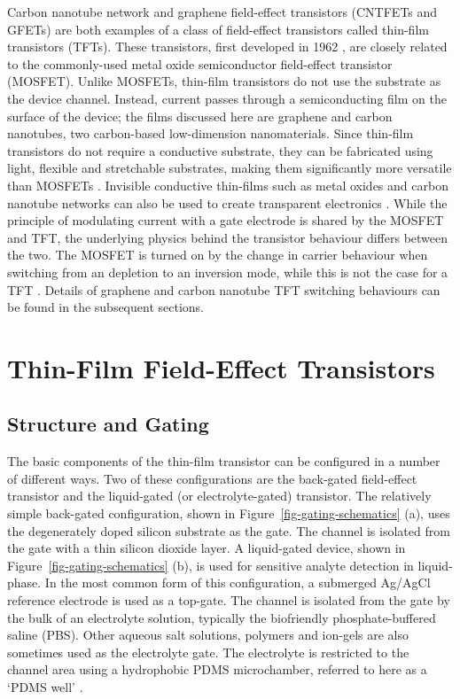 \documentclass[
  a4paper,
]{scrbook}
\begin{document}
Carbon nanotube network and graphene field-effect transistors (CNTFETs
and GFETs) are both examples of a class of field-effect transistors
called thin-film transistors (TFTs). These transistors, first developed
in 1962 \autocite{Weimer1962}, are closely related to the commonly-used
metal oxide semiconductor field-effect transistor (MOSFET). Unlike
MOSFETs, thin-film transistors do not use the substrate as the device
channel. Instead, current passes through a semiconducting film on the
surface of the device; the films discussed here are graphene and carbon
nanotubes, two carbon-based low-dimension nanomaterials. Since thin-film
transistors do not require a conductive substrate, they can be
fabricated using light, flexible and stretchable substrates, making them
significantly more versatile than MOSFETs
\autocite{Cao2009,Petti2016,Shkodra2021}. Invisible conductive
thin-films such as metal oxides and carbon nanotube networks can also be
used to create transparent electronics \autocite{Cao2009}. While the
principle of modulating current with a gate electrode is shared by the
MOSFET and TFT, the underlying physics behind the transistor behaviour
differs between the two. The MOSFET is turned on by the change in
carrier behaviour when switching from an depletion to an inversion mode,
while this is not the case for a TFT \autocite{Petti2016}. Details of
graphene and carbon nanotube TFT switching behaviours can be found in
the subsequent sections.

\hypertarget{sec-general-FETs}{%
\section{Thin-Film Field-Effect Transistors}\label{sec-general-FETs}}

\hypertarget{sec-gating}{%
\subsection{Structure and Gating}\label{sec-gating}}

The basic components of the thin-film transistor can be configured in a
number of different ways. Two of these configurations are the back-gated
field-effect transistor and the liquid-gated (or electrolyte-gated)
transistor. The relatively simple back-gated configuration, shown in
Figure~\ref{fig-gating-schematics} (a), uses the degenerately doped
silicon substrate as the gate. The channel is isolated from the gate
with a thin silicon dioxide layer. A liquid-gated device, shown in
Figure~\ref{fig-gating-schematics} (b), is used for sensitive analyte
detection in liquid-phase. In the most common form of this
configuration, a submerged Ag/AgCl reference electrode is used as a
top-gate. The channel is isolated from the gate by the bulk of an
electrolyte solution, typically the biofriendly phosphate-buffered
saline (PBS). Other aqueous salt solutions, polymers and ion-gels are
also sometimes used as the electrolyte gate. The electrolyte is
restricted to the channel area using a hydrophobic PDMS microchamber,
referred to here as a `PDMS well'
\autocite{Avouris2007,Shkodra2021,Tran2016,Li2023}.
\end{document}
